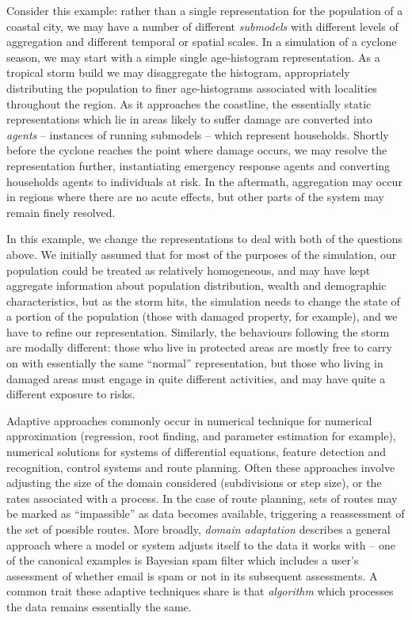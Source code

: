 Consider this example: rather than a single representation for the
population of a coastal city, we may have a number of
different \emph{submodels} with different levels of aggregation and
different temporal or spatial scales.  In a simulation of a cyclone
season, we may start with a simple single age-histogram representation.
As a tropical storm build we may disaggregate the histogram,
appropriately distributing the population to finer age-histograms
associated with localities throughout the region.  As it approaches
the coastline, the essentially static representations which lie in
areas likely to suffer damage are converted into \emph{agents}  -- 
instances of running submodels -- which represent households.
Shortly before the cyclone reaches the point where damage occurs, we
may resolve the representation further, instantiating emergency
response agents and converting households agents to individuals at
risk.  In the aftermath, aggregation may occur in regions where there
are no acute effects, but other parts of the system may remain finely
resolved.

In this example, we change the representations to deal with both
of the questions above.  We initially assumed that for most of the
purposes of the simulation, our population could be treated as
relatively homogeneous, and may have kept aggregate information about
population distribution, wealth and demographic characteristics, but
as the storm hits, the simulation needs to change the state of
a portion of the population (those with damaged property, for
example), and we have to refine our representation.  Similarly, the
behaviours following the storm are modally different: those who live
in protected areas are mostly free to carry on with essentially the
same ``normal'' representation, but those who living in damaged areas
must engage in quite different activities, and may have quite a
different exposure to risks.

Adaptive approaches commonly occur in numerical technique for
numerical approximation (regression, root finding, and parameter
estimation for example), numerical solutions for systems of
differential equations, feature detection and recognition, control
systems and route planning.  Often these approaches involve adjusting
the size of the domain considered (subdivisions or step size), or the
rates associated with a process. In the case of route planning, sets
of routes may be marked as ``impassible'' as data becomes available,
triggering a reassessment of the set of possible routes. More
broadly, \emph{domain adaptation} describes a general approach where a
model or system adjusts itself to the data it works with -- one of the
canonical examples is Bayesian spam filter which includes a user's
assessment of whether email is spam or not in its subsequent
assessments. A common trait these adaptive techniques share is that
\emph{algorithm} which processes the data remains essentially the same.

